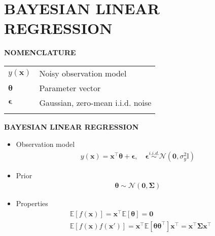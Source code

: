 \section{BAYESIAN LINEAR REGRESSION}

\begin{yellowbox}{\textbf{NOMENCLATURE}}
    \begin{tabularx}{\columnwidth}{ll}
        $y(\bm{x})$ & Noisy observation model\\
        \addlinespace[2pt]
        $\bm{\theta}$ & Parameter vector\\
        \addlinespace[2pt]
        $\bm{\epsilon}$ & Gaussian, zero-mean i.i.d. noise\\
        \addlinespace[2pt]
    \end{tabularx}
\end{yellowbox}

\begin{whitebox}{\textbf{BAYESIAN LINEAR REGRESSION}}
    \begin{itemize}
        \item Observation model
        \begin{align*}
            y(\bm{x})=\bm{x}^\top \bm{\theta}+\bm{\epsilon},\quad\bm{\epsilon}\overset{i.i.d.}{\sim}\mathcal{N}(\bm{0},\sigma_y^2\mathbb{I})
        \end{align*}
        \item Prior
        \begin{align*}
            \bm{\theta}\sim\mathcal{N}(\bm{0},\bm{\Sigma})
        \end{align*}
        \item Properties
        \begin{align*}
            &\mathbb{E}[f(\bm{x})]=\bm{x}^\top\mathbb{E}[\bm{\theta}]=\bm{0}\\
            &\mathbb{E}[f(\bm{x})f(\bm{x}')]=\bm{x}^\top\mathbb{E}[\bm{\theta\theta}^\top]\bm{x}^\top=\bm{x}^\top\bm{\Sigma} \bm{x}^\top %
        \end{align*}
    \end{itemize}
\end{whitebox}